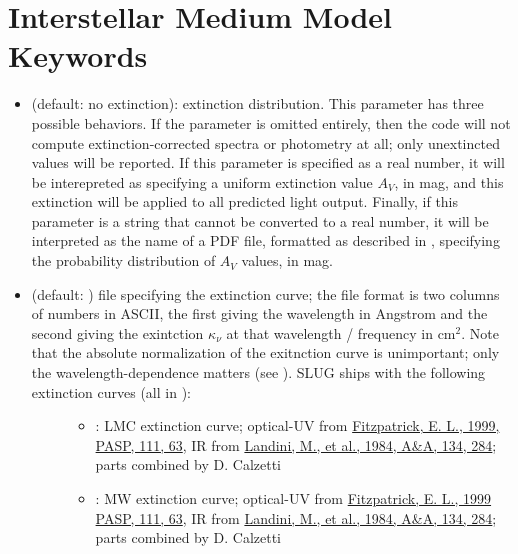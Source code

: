 \documentclass[letterpaper,10pt,english]{sphinxmanual}
\begin{document}
\section{Interstellar Medium Model Keywords}
\label{parameters:ssec-ism-keywords}\label{parameters:interstellar-medium-model-keywords}\begin{itemize}
\item {} 
 (default: no extinction): extinction distribution. This parameter has three possible behaviors. If the parameter  is omitted entirely, then the code will not compute extinction-corrected spectra or photometry at all; only unextincted values will be reported. If this parameter is specified as a real number, it will be interepreted as specifying a uniform extinction value \(A_V\), in mag, and this extinction will be applied to all predicted light output. Finally, if this parameter is a string that cannot be converted to a real number, it will be interpreted as the name of a PDF file, formatted as described in {\hyperref[pdfs:sec-pdfs]{\emph{}}}, specifying the probability distribution of \(A_V\) values, in mag.

\item {} \begin{description}
\item[{ (default: ) file specifying the extinction curve; the file format is two columns of numbers in ASCII, the first giving the wavelength in Angstrom and the second giving the exintction \(\kappa_\nu\) at that wavelength / frequency in \(\mathrm{cm}^2\). Note that the absolute normalization of the exitnction curve is unimportant; only the wavelength-dependence matters (see {\hyperref[intro:ssec-spec-phot]{\emph{}}}). SLUG ships with the following extinction curves (all in ):}] \leavevmode\begin{itemize}
\item {} 
 : LMC extinction curve; optical-UV from \href{http://adsabs.harvard.edu/abs/1999PASP..111...63F}{Fitzpatrick, E. L., 1999, PASP, 111, 63}, IR from \href{http://adsabs.harvard.edu/abs/1984A\%26A...134..284L}{Landini, M., et al., 1984, A\&A, 134, 284}; parts combined by D. Calzetti

\item {} 
 : MW extinction curve; optical-UV from \href{http://adsabs.harvard.edu/abs/1999PASP..111...63F}{Fitzpatrick, E. L., 1999 PASP, 111, 63}, IR from \href{http://adsabs.harvard.edu/abs/1984A\%26A...134..284L}{Landini, M., et al., 1984, A\&A, 134, 284}; parts combined by D. Calzetti


\end{itemize}
\end{description}
\end{itemize}
\end{document}
